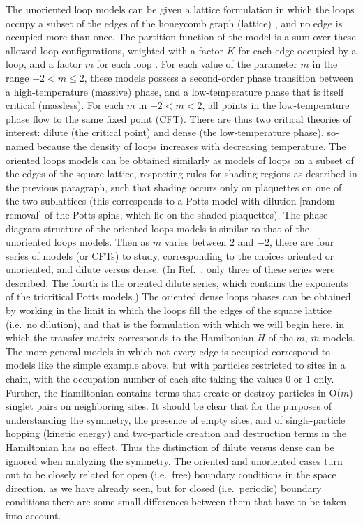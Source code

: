 \documentclass[twocolumn,floats,pra]{revtex4}
\begin{document}
The unoriented loop models can be given a lattice formulation in
which the loops occupy a subset of the edges of the honeycomb
graph (lattice) \cite{nien}, and no edge is occupied more than
once. The partition function of the model is a sum over these
allowed loop configurations, weighted with a factor $K$ for each
edge occupied by a loop, and a factor $m$ for each loop
\cite{nien}. For each value of the parameter $m$ in the range
$-2<m\leq 2$, these models possess a second-order phase transition
between a high-temperature (massive) phase, and a low-temperature
phase that is itself critical (massless). For each $m$ in
$-2<m<2$, all points in the low-temperature phase flow to the same
fixed point (CFT). There are thus two critical theories of
interest: dilute (the critical point) and dense (the
low-temperature phase), so-named because the density of loops
increases with decreasing temperature. The oriented loops models
can be obtained similarly as models of loops on a subset of the
edges of the square lattice, respecting rules for shading regions
as described in the previous paragraph, such that shading occurs
only on plaquettes on one of the two sublattices (this corresponds
to a Potts model with dilution [random removal] of the Potts
spins, which lie on the shaded plaquettes). The phase diagram
structure of the oriented loops models is similar to that of the
unoriented loops models. Then as $m$ varies between $2$ and $-2$,
there are four series of models (or CFTs) to study, corresponding
to the choices oriented or unoriented, and dilute versus dense.
(In Ref.\ \cite{rs}, only three of these series were described.
The fourth is the oriented dilute series, which contains the
exponents of the tricritical Potts models.) The oriented dense
loops phases can be obtained by working in the limit in which the
loops fill the edges of the square lattice (i.e.\ no dilution),
and that is the formulation with which we will begin here, in
which the transfer matrix corresponds to the Hamiltonian $H$ of
the $m$, $\overline{m}$ models. The more general models in which
not every edge is occupied correspond to models like the simple
example above, but with particles restricted to sites in a chain,
with the occupation number of each site taking the values 0 or 1
only. Further, the Hamiltonian contains terms that create or
destroy particles in O($m$)-singlet pairs on neighboring sites. It
should be clear that for the purposes of understanding the
symmetry, the presence of empty sites, and of single-particle
hopping (kinetic energy) and two-particle creation and destruction
terms in the Hamiltonian has no effect. Thus the distinction of
dilute versus dense can be ignored when analyzing the symmetry.
The oriented and unoriented cases turn out to be closely related
for open (i.e.\ free) boundary conditions in the space direction,
as we have already seen, but for closed (i.e.\ periodic) boundary
conditions there are some small differences between them that have
to be taken into account.
\end{document}
